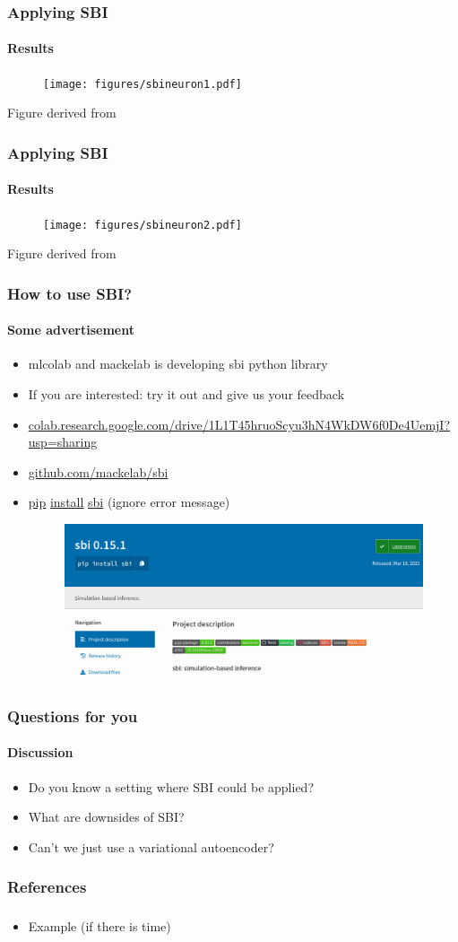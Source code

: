 \documentclass[9pt, aspectratio=169]{beamer}
\begin{document}

\begin{frame}
\frametitle{Applying SBI}
\framesubtitle{Results}
\begin{figure}
	\texttt{[image: figures/sbineuron1.pdf]}
\end{figure}
\vspace{50pt}
\tiny Figure derived from \cite{lueckmann2017flexible}
\end{frame}  
\begin{frame}
\frametitle{Applying SBI}
\framesubtitle{Results}
\begin{figure}
	\texttt{[image: figures/sbineuron2.pdf]}
\end{figure}
\vspace{50pt}
\tiny Figure derived from \cite{lueckmann2017flexible}
\end{frame}  





\begin{frame}
\frametitle{How to use SBI?}
\framesubtitle{Some advertisement}
\begin{itemize}
	\item mlcolab and mackelab is developing sbi python library \cite{tejero2020sbi}
	\item If you are interested: try it out and give us your feedback
	\item \url{colab.research.google.com/drive/1L1T45hruoScyu3hN4WkDW6f0De4UemjI?usp=sharing}
	\item \url{github.com/mackelab/sbi}
	\item \url{pip} \url{install} \url{sbi} (ignore error message)
		\begin{figure}
		\flushleft
		\includegraphics[width=.5\linewidth]{figures/sbipypi.png}
	\end{figure}
\end{itemize}
\end{frame} 


\begin{frame}
\frametitle{Questions for you}
\framesubtitle{Discussion}
\begin{itemize}
	\item Do you know a setting where SBI could be applied?
	\item What are downsides of SBI?
	\item Can't we just use a variational autoencoder?
\end{itemize}
\end{frame} 




\begin{frame}
\frametitle{References}
\framesubtitle{}

\end{frame} 

\begin{frame}
\frametitle{}
\framesubtitle{}
\begin{itemize}
	\item Example (if there is time)
\end{itemize}
\end{frame} 
\end{document}
